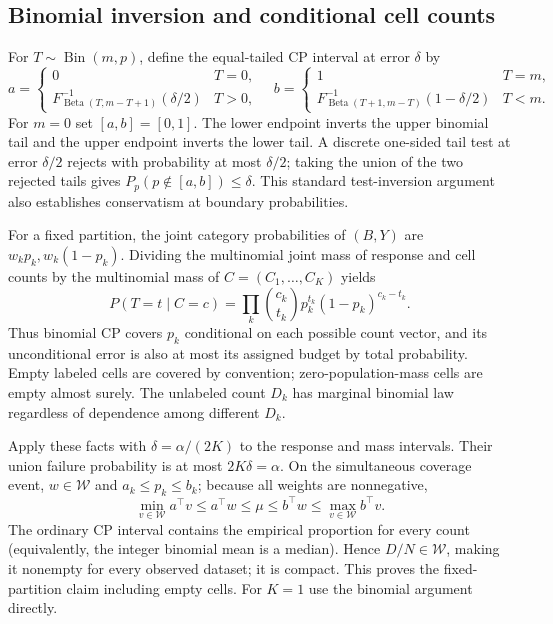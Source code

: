 \documentclass{article}
\begin{document}
\subsection{Binomial inversion and conditional cell counts}
For $T\sim\operatorname{Bin}(m,p)$, define the equal-tailed CP interval at error $\delta$ by
\begin{equation}\label{eq:cpformula}
 a=\begin{cases}0&T=0,\\ F^{-1}_{\operatorname{Beta}(T,m-T+1)}(\delta/2)&T>0,\end{cases}\quad
 b=\begin{cases}1&T=m,\\ F^{-1}_{\operatorname{Beta}(T+1,m-T)}(1-\delta/2)&T<m.\end{cases}
\end{equation}
For $m=0$ set $[a,b]=[0,1]$. The lower endpoint inverts the upper binomial tail and the upper endpoint inverts the lower tail. A discrete one-sided tail test at error $\delta/2$ rejects with probability at most $\delta/2$; taking the union of the two rejected tails gives $P_p(p\notin[a,b])\leq\delta$. This standard test-inversion argument also establishes conservatism at boundary probabilities.

For a fixed partition, the joint category probabilities of $(B,Y)$ are $w_kp_k,w_k(1-p_k)$. Dividing the multinomial joint mass of response and cell counts by the multinomial mass of $C=(C_1,\ldots,C_K)$ yields
\begin{equation}\label{eq:conditional}
 P(T=t\mid C=c)=\prod_k {c_k\choose t_k}p_k^{t_k}(1-p_k)^{c_k-t_k}.
\end{equation}
Thus binomial CP covers $p_k$ conditional on each possible count vector, and its unconditional error is also at most its assigned budget by total probability. Empty labeled cells are covered by convention; zero-population-mass cells are empty almost surely. The unlabeled count $D_k$ has marginal binomial law regardless of dependence among different $D_k$.

Apply these facts with $\delta=\alpha/(2K)$ to the response and mass intervals. Their union failure probability is at most $2K\delta=\alpha$. On the simultaneous coverage event, $w\in\mathcal W$ and $a_k\leq p_k\leq b_k$; because all weights are nonnegative,
\begin{equation}\label{eq:coveragechain}
 \min_{v\in\mathcal W}a^\top v\leq a^\top w\leq \mu\leq b^\top w\leq\max_{v\in\mathcal W}b^\top v.
\end{equation}
The ordinary CP interval contains the empirical proportion for every count (equivalently, the integer binomial mean is a median). Hence $D/N\in\mathcal W$, making it nonempty for every observed dataset; it is compact. This proves the fixed-partition claim including empty cells. For $K=1$ use the binomial argument directly.
\end{document}
